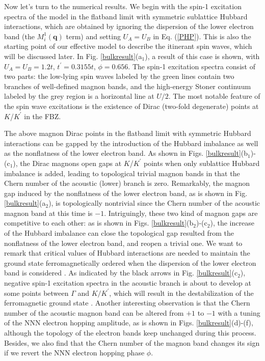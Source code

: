 \documentclass[amsmath,superscriptaddress,showpacs,aps,prl,twocolumn]{revtex4-1}
\begin{document}
\par Now let's turn to the numerical results. We begin with the spin-1 excitation spectra of the model in the flatband limit with symmetric sublattice Hubbard interactions, which are obtained by ignoring the dispersion of the lower electron band (the $M_i^1(\mathbf{q})$ term) and setting $U_A=U_B$ in Eq. (\ref{PHP}). This is also the starting point of our effective model to describe the itinerant spin waves, which will be discussed later. In Fig. \ref{bulkresult}(a$_1$), a result of this case is shown, with $U_A=U_B=1.2t$, $t^\prime=0.3155t$, $\phi=0.656$. The spin-1 excitation spectra consist of two parts: the low-lying spin waves labeled by the green lines contain two branches of well-defined magnon bands, and the high-energy Stoner continuum labeled by the grey region is a horizontal line at $U/2$. The most notable feature of the spin wave excitations is the existence of Dirac (two-fold degenerate) points at $K$/$K^\prime$ in the FBZ.

\par The above magnon Dirac points in the flatband limit with symmetric Hubbard interactions can be gapped by the introduction of the Hubbard imbalance as well as the nonflatness of the lower electron band. As shown in Figs. \ref{bulkresult}(b$_1$)-(c$_1$), the Dirac magnons open gaps at $K$/$K^\prime$ points when only sublattice Hubbard imbalance is added, leading to topological trivial magnon bands in that the Chern number of the acoustic (lower) branch is zero. Remarkably, the magnon gap induced by the nonflatness of the lower electron band, as is shown in Fig. \ref{bulkresult}(a$_2$), is topologically nontrivial since the Chern number of the acoustic magnon band at this time is $-1$. Intriguingly, these two kind of magnon gaps are competitive to each other: as is shown in Figs. \ref{bulkresult}(b$_2$)-(c$_2$), the increase of the Hubbard imbalance can close the topological gap resulted from the nonflatness of the lower electron band, and reopen a trivial one. We want to remark that critical values of Hubbard interactions are needed to maintain the ground state ferromagnetically ordered when the dispersion of the lower electron band is considered \cite{Tasaki_PRL1994,Su_PRB2019}. As indicated by the black arrows in Fig. \ref{bulkresult}(c$_2$), negative spin-1 excitation spectra in the acoustic branch is about to develop at some points between $\Gamma$ and $K/K^\prime$, which will result in the destabilization of the ferromagnetic ground state \cite{Su_PRB2019}. Another interesting observation is that the Chern number of the acoustic magnon band can be altered from $+1$ to $-1$ with a tuning of the NNN electron hopping amplitude, as is shown in Figs. \ref{bulkresult}(d)-(f), although the topology of the electron bands keep unchanged during this process. Besides, we also find that the Chern number of the magnon band changes its sign if we revert the NNN electron hopping phase $\phi$.
\end{document}
